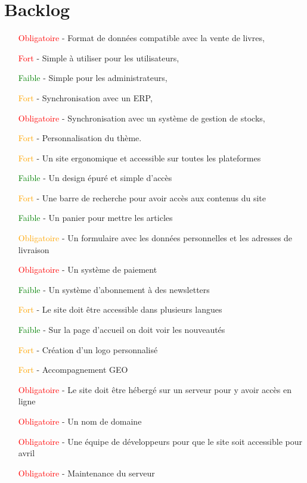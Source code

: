 \documentclass[a4paper,12pt]{report}
\begin{document}
\chapter{Backlog}
\begin{itemize}
\item[\textcolor{red}{Obligatoire} -] Format de données compatible avec la vente
  de livres,
\item[\textcolor{red}{Fort} -] Simple à utiliser pour les utilisateurs,
\item[\textcolor{green}{Faible} -] Simple pour les administrateurs,
\item[\textcolor{orange}{Fort} -] Synchronisation avec un ERP,
\item[\textcolor{red}{Obligatoire} -] Synchronisation avec un système de
  gestion de stocks,
\item[\textcolor{orange}{Fort} - ] Personnalisation du thème.
\item[\textcolor{orange}{Fort} - ] Un site ergonomique et accessible sur toutes les plateformes
\item[\textcolor{green}{Faible} - ] Un design épuré et simple d'accès
\item[\textcolor{orange}{Fort} - ] Une barre de recherche pour avoir accès aux contenus du site
\item[\textcolor{green}{Faible} - ] Un panier pour mettre les articles
\item[\textcolor{orange}{Obligatoire} - ] Un formulaire avec les
  données personnelles et les adresses de livraison
\item[\textcolor{red}{Obligatoire} - ] Un système de paiement
\item[\textcolor{green}{Faible} - ] Un système d'abonnement à des newsletters
\item[\textcolor{orange}{Fort} - ] Le site doit être accessible dans plusieurs langues
\item[\textcolor{green}{Faible} - ] Sur la page d'accueil on doit voir les nouveautés
\item[\textcolor{orange}{Fort} - ] Création d'un logo personnalisé
\item[\textcolor{orange}{Fort} - ] Accompagnement GEO
\item[\textcolor{red}{Obligatoire} - ] Le site doit être hébergé sur un serveur pour y avoir accès en ligne
\item[\textcolor{red}{Obligatoire} - ] Un nom de domaine
\item[\textcolor{red}{Obligatoire} - ] Une équipe de développeurs pour que le site soit accessible pour avril
\item[\textcolor{red}{Obligatoire} - ] Maintenance du serveur
\end{itemize}
\end{document}
